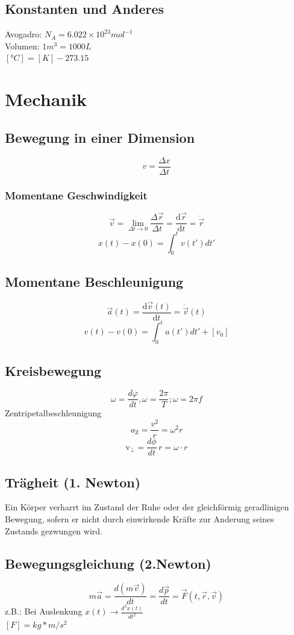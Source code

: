 \documentclass{article}
\begin{document}
\begin{multicols*}{3}
  \subsection{Konstanten und Anderes}
  Avogadro: $N_A=6.022 \times 10^{23} mol^{-1}$\\
  Volumen: $1 m^3 = 1000 L$
  \\$[°C] = [K] - 273.15$
\section{Mechanik}
  \subsection{Bewegung in einer Dimension}
  $$v = \frac{\Delta x}{\Delta t}$$
  \subsubsection{Momentane Geschwindigkeit}
  $${\displaystyle {\vec {v}}={\underset {\Delta t\rightarrow 0}{\lim }}{\frac {\Delta {\vec {r}}}{\Delta t}}={\frac {\mathrm {d} {\vec {r}}}{\mathrm {d} t}}={\dot {\vec {r}}}}$$
  $$x(t) - x(0) = \int_{0}^{t} v(t')dt'$$
  \subsection{Momentane Beschleunigung}
  $${\vec {a}}(t)={\frac {\mathrm {d} {\vec {v}}(t)}{\mathrm {d} t}}={\dot {\vec {v}}}(t)$$
  $$v(t) - v(0) = \int_{0}^{t} a(t')dt' + [v_0]$$

  \subsection{Kreisbewegung}
  $$\omega ={\frac {d\varphi }{dt}}, {\displaystyle \omega ={\frac {2\pi }{T}}};\omega = 2\pi f$$
  Zentripetalbeschleunigung
  $$a_{{{\mathrm  {Z}}}}={\frac  {v^{2}}{r}}=\omega ^{2}r$$
  $$\mathrm {v} _{\perp }={\frac {d\phi }{dt}}\,r=\omega \cdot r$$
  \subsection{Trägheit (1. Newton)}
  Ein Körper verharrt im Zustand der Ruhe oder der gleichförmig geradlinigen Bewegung,
  sofern er nicht durch einwirkende Kräfte zur Anderung seines Zustands gezwungen wird.

  \subsection{Bewegungsgleichung (2.Newton)}
  $$m\vec{a} = \frac{d(m\vec{v})}{dt} = \frac{d\vec{p}}{dt} = \vec{F}(t,\vec{r},\vec{v})$$
  z.B.: Bei Auslenkung $x(t)\rightarrow \frac{d^2x(t)}{dt^2}$
  \\$[F] = kg*m/s^2$

\end{multicols*}
\end{document}
